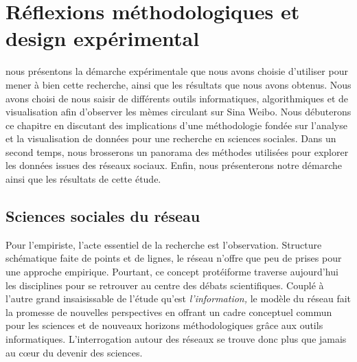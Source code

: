 \chapter{Réflexions méthodologiques et design expérimental}

 nous présentons la démarche expérimentale que nous avons choisie d{\textquoteright}utiliser pour mener à bien cette recherche, ainsi que les résultats que nous avons obtenus. Nous avons choisi de nous saisir de différents outils informatiques, algorithmiques et de visualisation afin d{\textquoteright}observer les mèmes circulant sur Sina Weibo. Nous débuterons ce chapitre en discutant des implications d{\textquoteright}une méthodologie fondée sur l{\textquoteright}analyse et la visualisation de données pour une recherche en sciences sociales. Dans un second temps, nous brosserons un panorama des méthodes utilisées pour explorer les données issues des réseaux sociaux. Enfin, nous présenterons notre démarche ainsi que les résultats de cette étude. 


\section[Sciences sociales du réseau]{Sciences sociales du réseau}
Pour l{\textquoteright}empiriste, l{\textquoteright}acte essentiel de la recherche est l{\textquoteright}observation. Structure schématique faite de points et de lignes, le réseau n{\textquoteright}offre que peu de prises pour une approche empirique. Pourtant, ce concept protéiforme traverse aujourd{\textquoteright}hui les disciplines pour se retrouver au centre des débats scientifiques. Couplé à l{\textquoteright}autre grand insaisissable de l{\textquoteright}étude qu{\textquoteright}est \textit{l{\textquoteright}information, }le modèle du réseau fait la promesse de nouvelles perspectives en offrant un cadre conceptuel commun pour les sciences et de nouveaux horizons méthodologiques gr\^ace aux outils informatiques. L{\textquoteright}interrogation autour des réseaux se trouve donc plus que jamais au c{\oe}ur du devenir des sciences. 

